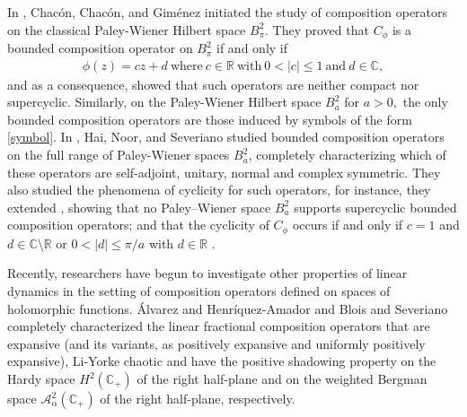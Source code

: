 \documentclass[11pt]{amsart}%
\numberwithin{equation}{section}
\theoremstyle{plain}
\theoremstyle{definition}
\theoremstyle{definition}
\begin{document}
In \cite{Chacon}, Chacón, Chacón, and Giménez initiated the study of composition operators on the classical Paley-Wiener Hilbert space $B^2_\pi.$ They proved that $C_\phi$ is a bounded composition operator on $B^2_\pi$ if and only if 
\begin{align}\label{symbol}
\phi(z)=cz+d\ \text{where} \ c\in \mathbb{R} \ \text{with} \ 0<|c|\leq 1 \ \text{and} \ d\in \mathbb{C},
\end{align}
 and as a consequence, showed that such operators are neither compact nor supercyclic. Similarly, on the Paley-Wiener Hilbert space $B^2_a$ for $a>0,$ the only bounded composition operators are those induced by symbols of the form \eqref{symbol}. In \cite{Hai}, Hai, Noor, and Severiano  studied bounded composition operators on the full range of Paley-Wiener spaces $B^2_a$, completely  characterizing which of these operators are self-adjoint, unitary, normal and complex symmetric. They also studied the phenomena of cyclicity for such operators, for instance, they extended \cite[Theorem 2.7]{Chacon}, showing that no Paley–Wiener space $B^2_a$ supports supercyclic bounded composition operators; and that the cyclicity of  $C_\phi$ occurs if and only if $c = 1$ and $d \in \mathbb{C}\setminus\mathbb{R}$ or 
$0 < |d| \leq \pi/a$ with $d \in \mathbb{R}$ \cite[Theorem 4]{Hai}.

Recently, researchers have begun to investigate other properties of linear dynamics in the setting of composition operators defined on spaces of holomorphic functions. \'Alvarez and Henr\'iquez-Amador \cite{Alvarez} and Blois and Severiano \cite{blois2025dynamics} completely characterized the linear fractional composition operators that are expansive (and its variants, as positively expansive and uniformly positively expansive), Li-Yorke chaotic and have the positive shadowing property on the Hardy space $H^2(\mathbb{C}_+)$ of the right half-plane  and on the weighted Bergman  space $\mathcal{A}_{\alpha}^2(\mathbb{C}_+)$ of the right half-plane, respectively. 
\end{document}
